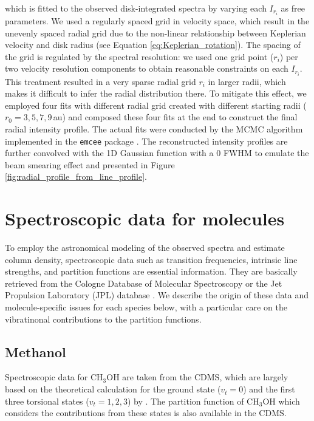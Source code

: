 \documentclass[twocolumn, twocolappendix, astrosymb, times]{aastex631}
\newcommand{\methanol}{CH$_3$OH\xspace}
\begin{document}
which is fitted to the observed disk-integrated spectra by varying each $I_{r_i}$ as free parameters. We used a regularly spaced grid in velocity space, which result in the unevenly spaced radial grid due to the non-linear relationship between Keplerian velocity and disk radius (see Equation \ref{eq:Keplerian_rotation}). The spacing of the grid is regulated by the spectral resolution: we used one grid point ($r_i$) per two velocity resolution components to obtain reasonable constraints on each $I_{r_i}$. This treatment resulted in a very sparse radial grid $r_i$ in larger radii, which makes it difficult to infer the radial distribution there. To mitigate this effect, we employed four fits with different radial grid created with different starting radii ($r_0 = 3, 5, 7, 9$\,au) and composed these four fits at the end to construct the final radial intensity profile. The actual fits were conducted by the MCMC algorithm implemented in the \texttt{emcee} package \citep{emcee}. The reconstructed intensity profiles are further convolved with the 1D Gaussian function with a 0 FWHM to emulate the beam smearing effect and presented in Figure \ref{fig:radial_profile_from_line_profile}.      

\section{Spectroscopic data for molecules}\label{appendix:spectroscopic_data}
To employ the astronomical modeling of the observed spectra and estimate column density, spectroscopic data such as transition frequencies, intrinsic line strengths, and partition functions are essential information. They are basically retrieved from the Cologne
Database of Molecular Spectroscopy \citep[CDMS;][]{CDMS1, CDMS2, CDMS3} or the Jet Propulsion Laboratory (JPL) database \citep{JPL}. We describe the origin of these data and molecule-specific issues for each species below, with a particular care on the vibratinonal contributions to the partition functions. 

\subsection{Methanol}
Spectroscopic data for \methanol are taken from the CDMS, which are largely based on the theoretical calculation for the ground state ($v_t = 0$) and the first three torsional states ($v_t = 1, 2, 3$) by \citet{Xu2008}. The partition function of \methanol which considers the contributions from these states is also available in the CDMS. 
\end{document}
